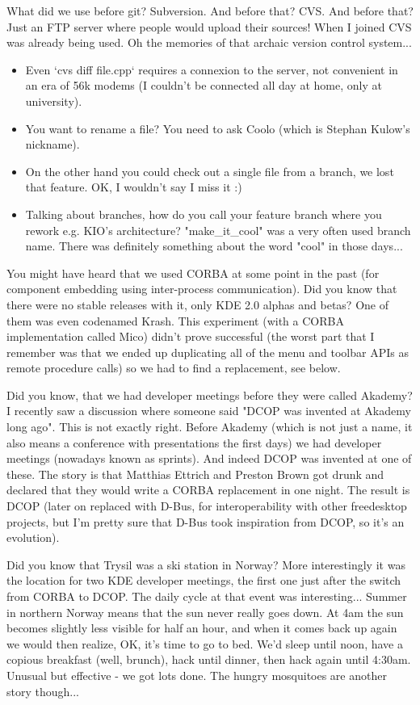 What did we use before git? Subversion. And before that? CVS. And before that? Just an FTP server where people would upload their sources!
When I joined CVS was already being used. Oh the memories of that archaic version control system...
\begin{itemize}
 \item Even `cvs diff file.cpp` requires a connexion to the server, not convenient in an era of 56k modems (I couldn't be connected all day at home, only at university).
 \item You want to rename a file? You need to ask Coolo (which is Stephan Kulow's nickname).
 \item On the other hand you could check out a single file from a branch, we lost that feature. OK, I wouldn't say I miss it :)
 \item Talking about branches, how do you call your feature branch where you rework e.g. KIO's architecture? "make\_it\_cool" was a very often used branch name. There was definitely something about the word "cool" in those days...
\end{itemize}

You might have heard that we used CORBA at some point in the past (for component embedding using inter-process communication). Did you know that there were no stable releases with it, only KDE 2.0 alphas and betas? One of them was even codenamed Krash. This experiment (with a CORBA implementation called Mico) didn't prove successful (the worst part that I remember was that we ended up duplicating all of the menu and toolbar APIs as remote procedure calls) so we had to find a replacement, see below.

Did you know, that we had developer meetings before they were called Akademy? I recently saw a discussion where someone said "DCOP was invented at Akademy long ago". This is not exactly right. Before Akademy (which is not just a name, it also means a conference with presentations the first days) we had developer meetings (nowadays known as sprints). And indeed DCOP was invented at one of these. 
The story is that Matthias Ettrich and Preston Brown got drunk and declared that they would write a CORBA replacement in one night. The result is DCOP (later on replaced with D-Bus, for interoperability with other freedesktop projects, but I'm pretty sure that D-Bus took inspiration from DCOP, so it's an evolution).

Did you know that Trysil was a ski station in Norway? More interestingly it was the location for two KDE developer meetings, the first one just after the switch from CORBA to DCOP.
The daily cycle at that event was interesting... Summer in northern Norway means that the sun never really goes down. At 4am the sun becomes slightly less visible for half an hour, and when it comes back up again we would then realize, OK, it's time to go to bed. We'd sleep until noon, have a copious breakfast (well, brunch), hack until dinner, then hack again until 4:30am. Unusual but effective - we got lots done. The hungry mosquitoes are another story though...


